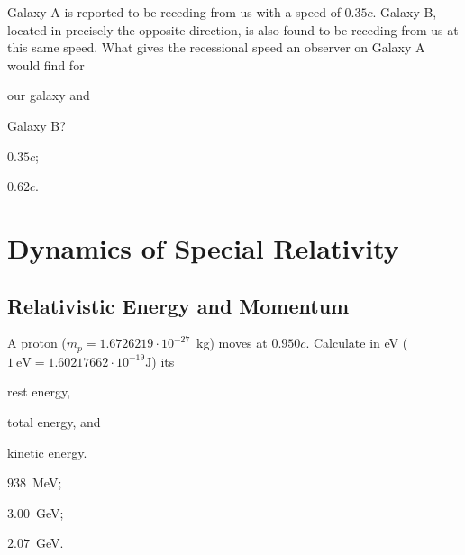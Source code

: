 \begin{problem}
	Galaxy A is reported to be receding from us with a speed of $0.35c$. Galaxy B, located in precisely the opposite direction, is also found to be receding from us at this same speed. What gives the recessional speed an observer on Galaxy A would find for 
	\begin{enumerate*}[label=(\alph*)]
		\item our galaxy and
		\item Galaxy B?
	\end{enumerate*}
	\begin{solution}
		\begin{enumerate*}[label=(\alph*)]
			\item $0.35c$; 
			\item $0.62c$.
		\end{enumerate*}
	\end{solution}
\end{problem}



\section{Dynamics of Special Relativity}

\subsection{Relativistic Energy and Momentum}


\begin{problem}
	A proton ($m_p = 1.6726219 \cdot  10^{-27}$~kg) moves at $0.950c$. Calculate in eV ($1~\si{\eV} = 1.60217662 \cdot 10^{-19}\si{\joule}$) its
	\begin{enumerate*}[label=(\alph*)]
		\item rest energy,
		\item  total energy, and
		\item kinetic energy.
	\end{enumerate*}
	\begin{solution}
		\begin{enumerate*}[label=(\alph*)]
			\item $938$~MeV;
			\item $3.00$~GeV; 
			\item $2.07$~GeV.
		\end{enumerate*}
	\end{solution}
\end{problem}



